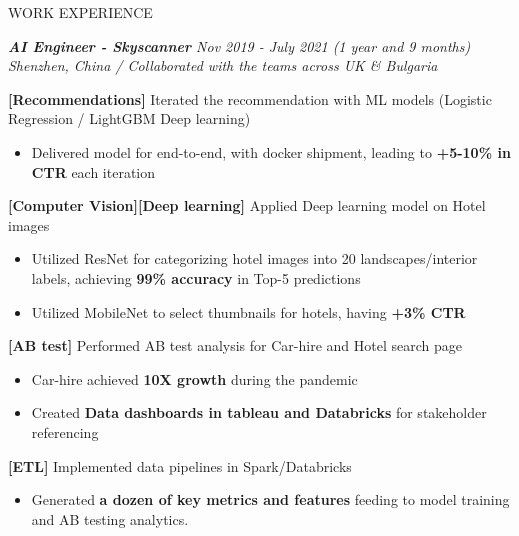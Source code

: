 \documentclass{resume} %
\begin{document}
\begin{rSection}{WORK EXPERIENCE}

\sl\textbf{AI Engineer - Skyscanner} \hfill {Nov 2019 - July 2021 (1 year and 9 months)}\\
Shenzhen, China / Collaborated with the teams across UK \& Bulgaria\ 

\item [\textbullet] \textbf{[Recommendations]} Iterated the recommendation with ML models (Logistic Regression / LightGBM Deep learning)
    \begin{itemize}
    \item Delivered model for end-to-end, with docker shipment, leading to \textbf{+5-10\% in CTR} each iteration
    \end{itemize}

\item [\textbullet] \textbf{[Computer Vision][Deep learning]} Applied Deep learning model on Hotel images
    \begin{itemize}
    \item Utilized ResNet for categorizing hotel images into 20 landscapes/interior labels, achieving \textbf{99\% accuracy} in Top-5 predictions
    \item Utilized MobileNet to select thumbnails for hotels, having \textbf{+3\% CTR}
    \end{itemize}

\item [\textbullet] \textbf{[AB test]} Performed AB test analysis for Car-hire and Hotel search page
    \begin{itemize}
    \item Car-hire achieved \textbf{10X growth} during the pandemic
    \item Created \textbf{Data dashboards in tableau and Databricks} for stakeholder referencing
    \end{itemize}

\item [\textbullet] \textbf{[ETL]} Implemented data pipelines in Spark/Databricks
    \begin{itemize}
    \item Generated \textbf{a dozen of key metrics and features} feeding to model training and AB testing analytics.
    \end{itemize}


\end{rSection}
\end{document}
